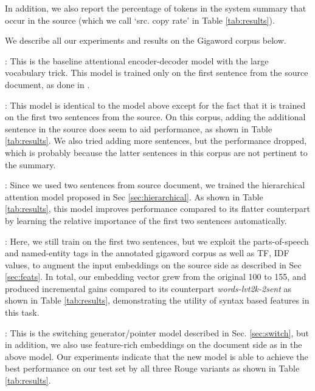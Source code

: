 \documentclass[11pt]{article}
\begin{document}
In addition, we also report the percentage of tokens in the system summary that occur in the source (which we call `src. copy rate' in Table \ref{tab:results}). 

\noindent We describe all our experiments and results on the Gigaword corpus below.




: This is the baseline attentional encoder-decoder model with the large vocabulary trick. This model is trained only on the first sentence from the source document, as done in .

: This model is identical to the model above except for the fact that it is trained on the first two sentences from the source. On this corpus, adding the additional sentence in the source does seem to aid performance, as shown in Table \ref{tab:results}. We also tried adding more sentences, but the performance dropped, which is probably because the latter sentences in this corpus are not pertinent to the summary.







:  Since we used two sentences from source document, we trained the hierarchical attention model proposed in Sec \ref{sec:hierarchical}. As shown in Table \ref{tab:results}, this model improves performance compared to its flatter counterpart by learning the relative importance of the first two sentences automatically. 



:  Here, we still train on the first two sentences, but we exploit the parts-of-speech and named-entity tags in the annotated gigaword corpus as well as TF, IDF values, to augment the input embeddings on the source side as described in Sec \ref{sec:feats}.
In total, our embedding vector grew from the original 100 to 155, and produced incremental gains compared to its counterpart {\it words-lvt2k-2sent} as shown in Table \ref{tab:results}, demonstrating the utility of syntax based features in this task. 




: This is the switching generator/pointer model described in Sec. \ref{sec:switch}, but in addition, we also use feature-rich embeddings on the document side as in the above model.
Our experiments indicate that the new model is able to achieve the best performance on our test set by all three Rouge variants as shown in Table \ref{tab:results}.
\end{document}
